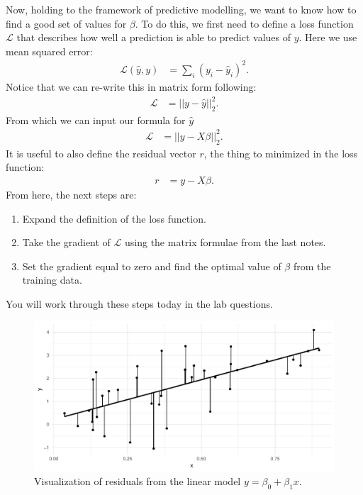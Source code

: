 \documentclass[12pt,hidelinks]{article}
\numberwithin{equation}{section}
\begin{document}
Now, holding to the framework of predictive modelling, we want to know how to
find a good set of values for $\beta$. To do this, we first need to define a loss
function $\mathcal{L}$ that describes how well a prediction is able to predict
values of $y$. Here we use mean squared error:
\begin{align}
\mathcal{L}(\widehat{y}, y) &= \sum_i (y_i - \widehat{y}_i)^2.
\end{align}
Notice that we can re-write this in matrix form following:
\begin{align}
\mathcal{L} &= || y - \widehat{y} ||_2^2.
\end{align}
From which we can input our formula for $\widehat{y}$
\begin{align}
\mathcal{L} &= || y - X \beta ||_2^2. \label{lloss}
\end{align}
It is useful to also define the residual vector $r$, the thing to minimized
in the loss function:
\begin{align}
r &= y - X\beta.
\end{align}
From here, the next steps are:
\begin{enumerate}
\item Expand the definition of the loss function.
\item Take the gradient of $\mathcal{L}$ using the matrix formulae from the last notes.
\item Set the gradient equal to zero and find the optimal value of $\beta$ from
the training data.
\end{enumerate}
You will work through these steps today in the lab questions.

\begin{figure}
\includegraphics[width=\textwidth]{figures/lm_residuals.pdf}
\caption[Residuals from a simple linear model]{Visualization of residuals
from the linear model $y = \beta_0 + \beta_1 x$.}
\label{lm_residuals}
\end{figure}
\end{document}
